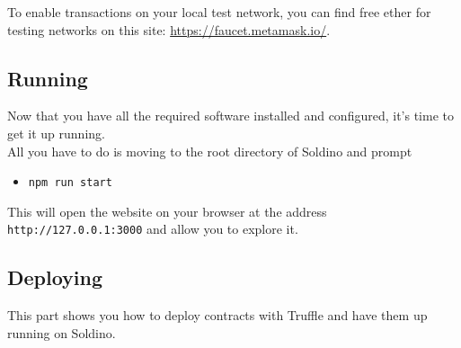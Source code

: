 To enable transactions on your local test network, you can find free ether for testing networks on this site: \href{https://faucet.metamask.io/}{https://faucet.metamask.io/}.


\subsection{Running}
Now that you have all the required software installed and configured, it's time to get it up running.\\
All you have to do is moving to the root directory of Soldino and prompt
\begin{itemize}
	\item[]\texttt{npm run start}
\end{itemize}
This will open the website on your browser at the address \texttt{http://127.0.0.1:3000} and allow you to explore it. 


\subsection{Deploying}
This part shows you how to deploy contracts with Truffle and have them up running on Soldino.
% 